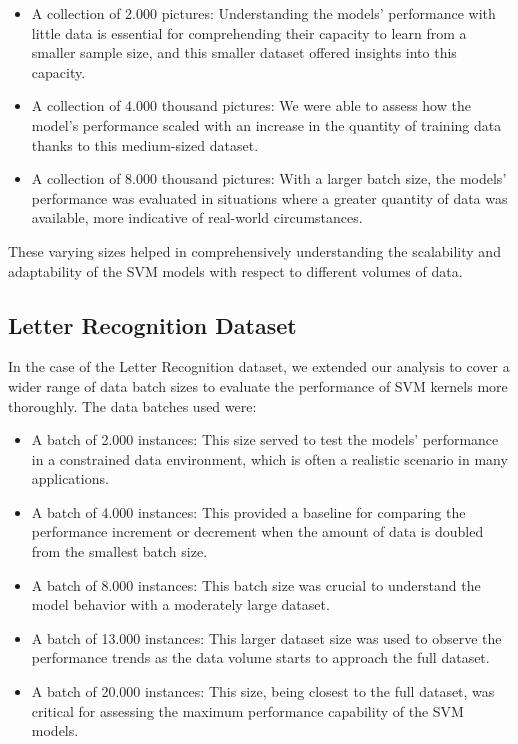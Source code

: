 \documentclass[conference]{IEEEtran}
\begin{document}
\begin{itemize}
\item A collection of 2.000 pictures: Understanding the models' performance with little data is essential for comprehending their capacity to learn from a smaller sample size, and this smaller dataset offered insights into this capacity.
\item A collection of 4.000 thousand pictures: We were able to assess how the model's performance scaled with an increase in the quantity of training data thanks to this medium-sized dataset.
\item A collection of 8.000 thousand pictures: With a larger batch size, the models' performance was evaluated in situations where a greater quantity of data was available, more indicative of real-world circumstances.
\end{itemize}

These varying sizes helped in comprehensively understanding the scalability and adaptability of the SVM models with respect to different volumes of data.

\subsection{Letter Recognition Dataset}

In the case of the Letter Recognition dataset, we extended our analysis to cover a wider range of data batch sizes to evaluate the performance of SVM kernels more thoroughly. The data batches used were:

\begin{itemize}
\item A batch of 2.000 instances: This size served to test the models' performance in a constrained data environment, which is often a realistic scenario in many applications.
\item A batch of 4.000 instances: This provided a baseline for comparing the performance increment or decrement when the amount of data is doubled from the smallest batch size.
\item A batch of 8.000 instances: This batch size was crucial to understand the model behavior with a moderately large dataset.
\item A batch of 13.000 instances: This larger dataset size was used to observe the performance trends as the data volume starts to approach the full dataset.
\item A batch of 20.000 instances: This size, being closest to the full dataset, was critical for assessing the maximum performance capability of the SVM models.
\end{itemize}
\end{document}
